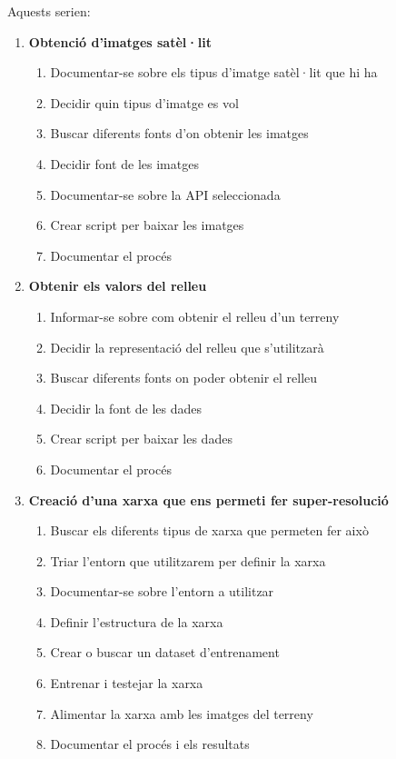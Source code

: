 ﻿\documentclass[10pt,a4paper,twocolumn,twoside]{article}
\begin{document}
Aquests serien:
\begin{enumerate}
\item \textbf{Obtenció d'imatges satèl·lit}
\begin{enumerate}
\item Documentar-se sobre els tipus d'imatge satèl·lit que hi ha
\item Decidir quin tipus d'imatge es vol
\item Buscar diferents fonts d'on obtenir les imatges
\item Decidir font de les imatges
\item Documentar-se sobre la API seleccionada
\item Crear script per baixar les imatges
\item Documentar el procés
\end{enumerate}

\item \textbf{Obtenir els valors del relleu}
\begin{enumerate}
\item Informar-se sobre com obtenir el relleu d'un terreny
\item Decidir la representació del relleu que s'utilitzarà
\item Buscar diferents fonts on poder obtenir el relleu
\item Decidir la font de les dades
\item Crear script per baixar les dades
\item Documentar el procés
\end{enumerate}

\item \textbf{Creació d'una xarxa que ens permeti fer super-resolució}
\begin{enumerate}
\item Buscar els diferents tipus de xarxa que permeten fer això
\item Triar l'entorn que utilitzarem per definir la xarxa
\item Documentar-se sobre l'entorn a utilitzar
\item Definir l'estructura de la xarxa
\item Crear o buscar un dataset d'entrenament
\item Entrenar i testejar la xarxa
\item Alimentar la xarxa amb les imatges del terreny
\item Documentar el procés i els resultats
\end{enumerate}


\end{enumerate}
\end{document}
